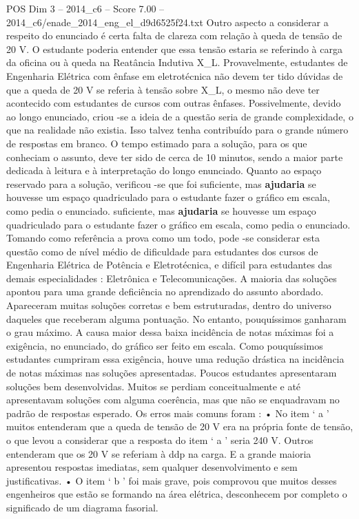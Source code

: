 \begin{textsample}{POS Dim 3 – 2014\_c6 – Score 7.00 – 2014\_c6/enade\_2014\_eng\_el\_d9d6525f24.txt}
Outro aspecto a considerar a respeito do enunciado é certa falta de clareza com relação à queda de tensão de 20 V.
O estudante poderia entender que essa tensão estaria se referindo à carga da oficina ou à queda na Reatância Indutiva X\_L.
Provavelmente, estudantes de Engenharia Elétrica com ênfase em eletrotécnica não devem ter tido dúvidas de que a queda de 20 V se referia à tensão sobre X\_L, o mesmo não deve ter acontecido com estudantes de cursos com outras ênfases.
Possivelmente, devido ao longo enunciado, criou -se a ideia de a questão seria de grande complexidade, o que na realidade não existia.
Isso talvez tenha contribuído para o grande número de respostas em branco.
O tempo estimado para a solução, para os que conheciam o assunto, deve ter sido de cerca de 10 minutos, sendo a maior parte dedicada à leitura e à interpretação do longo enunciado.
Quanto ao espaço reservado para a solução, verificou -se que foi suficiente, mas \textbf{ajudaria} se houvesse um espaço quadriculado para o estudante fazer o gráfico em escala, como pedia o enunciado. suficiente, mas \textbf{ajudaria} se houvesse um espaço quadriculado para o estudante fazer o gráfico em escala, como pedia o enunciado.
Tomando como referência a prova como um todo, pode -se considerar esta questão como de nível médio de dificuldade para estudantes dos cursos de Engenharia Elétrica de Potência e Eletrotécnica, e difícil para estudantes das demais especialidades : Eletrônica e Telecomunicações.
A maioria das soluções apontou para uma grande deficiência no aprendizado do assunto abordado.
Apareceram muitas soluções corretas e bem estruturadas, dentro do universo daqueles que receberam alguma pontuação.
No entanto, pouquíssimos ganharam o grau máximo.
A causa maior dessa baixa incidência de notas máximas foi a exigência, no enunciado, do gráfico ser feito em escala.
Como pouquíssimos estudantes cumpriram essa exigência, houve uma redução drástica na incidência de notas máximas nas soluções apresentadas.
Poucos estudantes apresentaram soluções bem desenvolvidas.
Muitos se perdiam conceitualmente e até apresentavam soluções com alguma coerência, mas que não se enquadravam no padrão de respostas esperado.
Os erros mais comuns foram : • No item ‘ a ’ muitos entenderam que a queda de tensão de 20 V era na própria fonte de tensão, o que levou a considerar que a resposta do item ‘ a ’ seria 240 V.
Outros entenderam que os 20 V se referiam à ddp na carga.
E a grande maioria apresentou respostas imediatas, sem qualquer desenvolvimento e sem justificativas. • O item ‘ b ’ foi mais grave, pois comprovou que muitos desses engenheiros que estão se formando na área elétrica, desconhecem por completo o significado de um diagrama fasorial.

\end{textsample}
